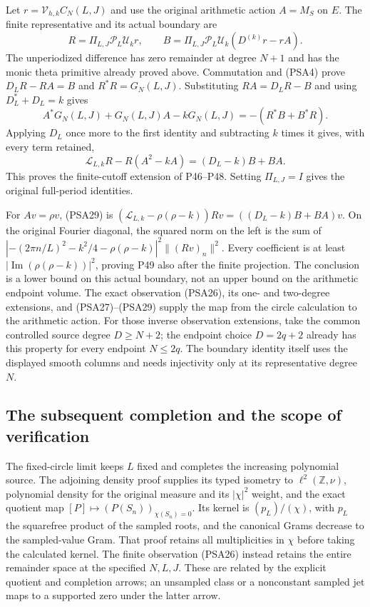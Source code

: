 \documentclass{article}
\begin{document}
Let $r=\mathcal V_{h,k}C_N(L,J)$ and use the original arithmetic
action $A=M_S$ on $E$. The finite representative and its actual
boundary are
\[
 R=\Pi_{L,J}\mathcal P_L\mathcal U_kr,\qquad
 B=\Pi_{L,J}\mathcal P_L\mathcal U_k(D^{(k)}r-rA).
 \tag{PSA27}
\]
The unperiodized difference has zero remainder at degree $N+1$ and
has the monic theta primitive already proved above. Commutation and
(PSA4) prove $D_LR-RA=B$ and $R^*R=G_N(L,J)$. Substituting
$RA=D_LR-B$ and using $D_L^*+D_L=k$ gives
\[
 A^*G_N(L,J)+G_N(L,J)A-kG_N(L,J)
 =-(R^*B+B^*R).
 \tag{PSA28}
\]
Applying $D_L$ once more to the first identity and subtracting $k$
times it gives, with every term retained,
\[
 \mathscr L_{L,k}R-R(A^2-kA)=(D_L-k)B+BA.
 \tag{PSA29}
\]
This proves the finite-cutoff extension of P46--P48. Setting
$\Pi_{L,J}=I$ gives the original full-period identities.

For $Av=\rho v$, (PSA29) is
$(\mathscr L_{L,k}-\rho(\rho-k))Rv=((D_L-k)B+BA)v$.
On the original Fourier diagonal, the squared norm on the left is
the sum of
$|-(2\pi n/L)^2-k^2/4-\rho(\rho-k)|^2\|(Rv)_n\|^2$.
Every coefficient is at least
$|\operatorname{Im}(\rho(\rho-k))|^2$, proving P49 also after the
finite projection. The conclusion is a lower bound on this actual
boundary, not an upper bound on the arithmetic endpoint volume.
The exact observation (PSA26), its one- and two-degree extensions,
and (PSA27)--(PSA29) supply the map from the circle calculation to
the arithmetic action.
For those inverse observation extensions, take the common controlled
source degree $D\ge N+2$; the endpoint choice $D=2q+2$ already has
this property for every endpoint $N\le2q$. The boundary identity
itself uses the displayed smooth columns and needs injectivity only
at its representative degree $N$.

\subsection{The subsequent completion and the scope of verification}

The fixed-circle limit keeps $L$ fixed and completes the increasing
polynomial source. The adjoining density proof supplies its typed
isometry to $\ell^2(\mathbb Z,\nu)$, polynomial density for the
original measure and its $|\chi|^2$ weight, and the exact quotient
map $[P]\mapsto(P(S_n))_{\chi(S_n)=0}$. Its kernel is
$(p_L)/(\chi)$, with $p_L$ the squarefree product of the sampled
roots, and the canonical Grams decrease to the sampled-value Gram.
That proof retains all multiplicities in $\chi$ before taking the
calculated kernel. The finite observation (PSA26) instead retains
the entire remainder space at the specified $N,L,J$. These are
related by the explicit quotient and completion arrows; an
unsampled class or a nonconstant sampled jet maps to a supported
zero under the latter arrow.
\end{document}
